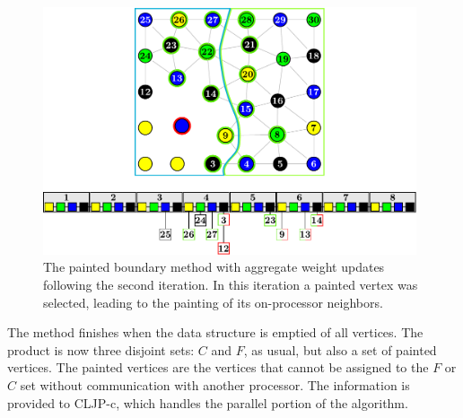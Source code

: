 \documentclass{elsart}
\begin{document}
\begin{figure}
  \begin{center}
    \includegraphics[width=0.98\textwidth]{images/BSIS/cp2p}
    \caption{The painted boundary method with aggregate weight
    updates following the second iteration. In this iteration a
    painted vertex was selected, leading to the painting of its
    on-processor neighbors.}
    \label{5:fig:cp2-parallel}
  \end{center}
\end{figure}
The method finishes when the data structure is emptied of all
vertices. The product is now three disjoint sets: $C$ and $F$, as
usual, but also a set of painted vertices. The painted vertices are
the vertices that cannot be assigned to the $F$ or $C$ set without
communication with another processor. The information is provided to
CLJP-c, which handles the parallel portion of the algorithm.
\end{document}

